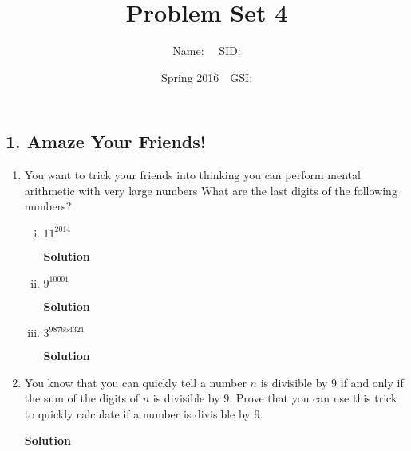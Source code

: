 \documentclass{article}\usepackage{amsmath,amssymb,amsthm,tikz,tkz-graph,color,chngpage,soul,hyperref,csquotes,graphicx,floatrow}\newcommand*{\QEDB}{\hfill\ensuremath{\square}}\newtheorem*{prop}{Proposition}\renewcommand{\theenumi}{\alph{enumi}}\usepackage[shortlabels]{enumitem}\usepackage[nobreak=true]{mdframed}\usetikzlibrary{matrix,calc}\MakeOuterQuote{"}\usepackage[margin=0.75in]{geometry}
\title{Problem Set 4}
\author{Name: $\quad$SID: }
\date{Spring 2016$\quad$GSI: }
\begin{document}
\maketitle


\subsection*{1. Amaze Your Friends!}
\begin{enumerate}
\item You want to trick your friends into thinking you can perform mental arithmetic with very large numbers What are the last digits of the following numbers?
\begin{enumerate}[i.]
\item $11^{2014}$
\begin{mdframed}
\textbf{Solution}

\end{mdframed}
\item $9^{10001}$
\begin{mdframed}
\textbf{Solution}

\end{mdframed}
\item $3^{987654321}$
\begin{mdframed}
\textbf{Solution}

\end{mdframed}
\end{enumerate}
\item You know that you can quickly tell a number $n$ is divisible by $9$ if and only if the sum of the digits of $n$ is divisible by $9$. Prove that you can use this trick to quickly calculate if a number is divisible by $9$.
\begin{mdframed}
\textbf{Solution}

\end{mdframed}
\end{enumerate}
\clearpage

\end{document}
